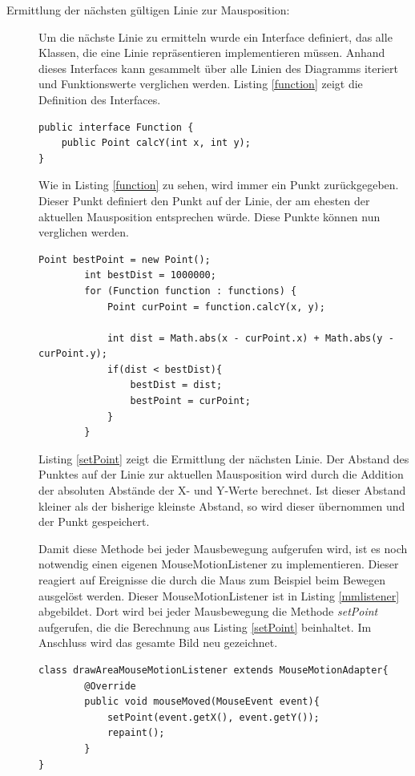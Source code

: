 \begin{description}
\item[Ermittlung der nächsten gültigen Linie zur Mausposition:] Um die nächste Linie zu ermitteln wurde ein Interface definiert, das alle Klassen, die eine Linie repräsentieren implementieren müssen. Anhand dieses Interfaces kann gesammelt über alle Linien des Diagramms iteriert und Funktionswerte verglichen werden. Listing \ref{function} zeigt die Definition des Interfaces.
\begin{lstlisting}[captionpos=b, caption=Interface für die Linien, label=function]
public interface Function {
    public Point calcY(int x, int y);
}
\end{lstlisting}

Wie in Listing \ref{function} zu sehen, wird immer ein Punkt zurückgegeben. Dieser Punkt definiert den Punkt auf der Linie, der am ehesten der aktuellen Mausposition entsprechen würde. Diese Punkte können nun verglichen werden.
\begin{lstlisting}[captionpos=b, caption=Methode zum ermitteln des nächsten Punktes, label=setPoint]
Point bestPoint = new Point();
        int bestDist = 1000000;
        for (Function function : functions) {
            Point curPoint = function.calcY(x, y);

            int dist = Math.abs(x - curPoint.x) + Math.abs(y -curPoint.y);
            if(dist < bestDist){
                bestDist = dist;
                bestPoint = curPoint;
            }
        }
\end{lstlisting}

Listing \ref{setPoint} zeigt die Ermittlung der nächsten Linie. Der Abstand des Punktes auf der Linie zur aktuellen Mausposition wird durch die Addition der absoluten Abstände der X- und Y-Werte berechnet. Ist dieser Abstand kleiner als der bisherige kleinste Abstand, so wird dieser übernommen und der Punkt gespeichert. 

Damit diese Methode bei jeder Mausbewegung aufgerufen wird, ist es noch notwendig einen eigenen MouseMotionListener zu implementieren. Dieser reagiert auf Ereignisse die durch die Maus zum Beispiel beim Bewegen ausgelöst werden. Dieser MouseMotionListener ist in Listing \ref{mmlistener} abgebildet. Dort wird bei jeder Mausbewegung die Methode \emph{setPoint} aufgerufen, die die Berechnung aus Listing \ref{setPoint} beinhaltet. Im Anschluss wird das gesamte Bild neu gezeichnet.
\begin{lstlisting}[captionpos=b, caption=MouseMotionListener, label=mmlistener]
class drawAreaMouseMotionListener extends MouseMotionAdapter{
        @Override
        public void mouseMoved(MouseEvent event){
            setPoint(event.getX(), event.getY());
            repaint();
        }
}
\end{lstlisting}


\end{description}
